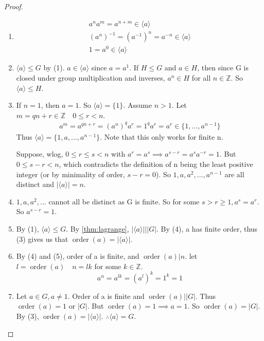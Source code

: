 \documentclass[11pt, oneside]{book}
\theoremstyle{break}
\newtheorem*{proof}{Proof}
\newcommand{\bb}[1]{\mathbb{#1}}			%
\DeclareMathOperator{\order}{order}
\begin{document}
\begin{proof}
    \begin{enumerate}
        \item \begin{gather*}
            a^n a^m = a^{n + m} \in \langle a \rangle \\
            (a^n)^{-1} = (a^{-1})^n = a^{-n} \in \langle a \rangle \\
            1 = a^0 \in \langle a \rangle
        \end{gather*}

        \item $\langle a \rangle \leq G$ by (1). $a \in \langle a \rangle$ since $a = a^1$. If $H \leq G$ and $a \in H$, then since G is closed under group multiplication and inverses, $a^n \in H$ for all $n \in \bb{Z}$. So $\langle a \rangle \leq H$.

        \item If $n = 1$, then $a = 1$. So $\langle a \rangle = \{1\}$. Assume $n > 1$. Let $m = qn + r \in \bb{Z} \quad 0 \leq r < n$.
            \begin{gather*}
                a^m = a^{qn + r} = (a^n)^q a^r = 1^q a^r = a^r \in \{1, ..., a^{n - 1}\}
            \end{gather*}
            Thus $\langle a \rangle = \{1, a, ..., a^{n - 1}\}$. Note that this only works for finite n.

            Suppose, wlog, $0 \leq r \leq s < n$ with $a^r = a^s \implies a^{s - r} = a^s a^{-r} = 1$. But $0 \leq s - r < n$, which contradicts the definition of n being the least positive integer (or by minimality of order, $s - r = 0$). So $1, a, a^2, ..., a^{n - 1}$ are all distinct and $|\langle a \rangle| = n$.

        \item $1, a, a^2, ...$ cannot all be distinct as G is finite. So for some $s > r \geq 1, a^s = a^r$. So $a^{s-r} = 1$.

        \item By (1), $\langle a \rangle \leq G$. By \autoref{thm:lagrange}, $|\langle a \rangle| \Big| |G|$. By (4), a has finite order, thus (3) gives us that $\order(a) = |\langle a \rangle|$.

        \item By (4) and (5), order of a is finite, and $\order(a) \Big| n$. let $l = \order(a) \quad n = lk$ for some $k \in \bb{Z}$.
            \begin{equation*}
                a^n = a^{lk} = (a^l)^k = 1^k = 1
            \end{equation*}

        \item Let $a \in G, a \neq 1$. Order of a is finite and $\order(a) \Big| |G|$. Thus $\order(a) = 1$ or $|G|$. But $\order(a) = 1 \implies a = 1$. So $\order(a) = |G|$. By (3), $\order(a) = |\langle a \rangle|$. $\therefore \langle a \rangle = G$.
     \end{enumerate}
\end{proof}
\end{document}
